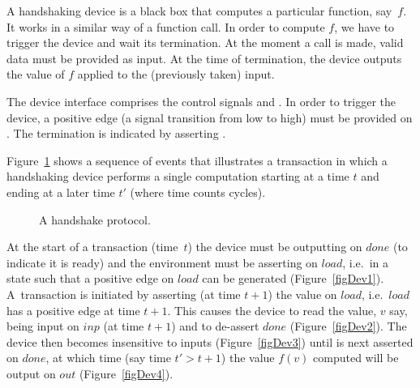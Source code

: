 \documentclass{llncs}
\begin{document}
A handshaking device is a black box that 
computes a particular function, say~$f$. 
It works in a similar way of a function call.
In order to compute $f$, we have to trigger 
the device and wait its termination.
At the moment a call is made, valid data
must be provided as input. At the time of
termination, the device outputs the value
of $f$ applied to the (previously taken) input.

The device interface comprises
the control signals  and .
In order to trigger the device, a positive
edge (a signal transition from low to high)
must be provided on . The termination
is indicated by asserting .

Figure~\ref{figDev} shows a sequence of events that illustrates a
transaction in which a handshaking device performs a single
computation starting at a time $t$ and ending at a later time $t'$
(where time counts cycles). 

\begin{figure}[htb]
   \centerline{
      }
   \hspace*{0.4cm}
   \centerline{
      \hspace*{0cm}}
      \caption{\label{figDev}A handshake protocol.}
\end{figure}
At the start of a transaction (time~$t$) the device must be outputting  on $done$
(to indicate it is ready) and the environment must be asserting
 on $load$, i.e.~in a state such that a positive edge on $load$
can be generated (Figure~\ref{figDev1}). 
A~transaction is initiated by asserting (at time
$t{+}1$) the value  on $load$, i.e.~$load$ has a positive edge
at time $t{+}1$. This causes the device to read the value, $v$
say, being input on $inp$ (at time $t{+}1$) and to de-assert $done$
(Figure~\ref{figDev2}).
The device then becomes insensitive to inputs (Figure~\ref{figDev3})
until  is next asserted on $done$,
at which time (say time $t' > t{+}1$) the value
$f(v)$ computed will be output on $out$ (Figure~\ref{figDev4}).
\end{document}
